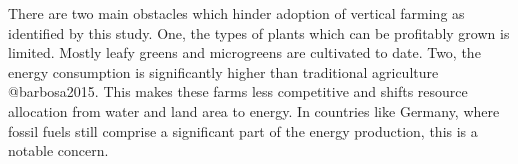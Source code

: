 There are two main obstacles which hinder adoption of vertical farming as identified by this study.
One, the types of plants which can be profitably grown is limited.
Mostly leafy greens and microgreens are cultivated to date. %
Two, the energy consumption is significantly higher than traditional agriculture @barbosa2015.
This makes these farms less competitive and shifts resource allocation from water and land area to energy.
In countries like Germany, where fossil fuels still comprise a significant part of the energy production, this is a notable concern.






